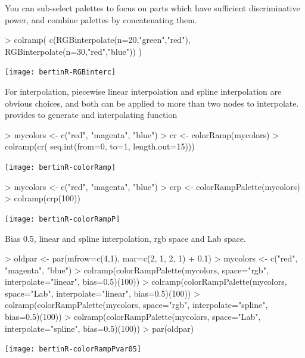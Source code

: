 \documentclass[nogin, dvips,12pt,a4paper,twoside]{amsart}
\begin{document}
\clearpage

You can sub-select palettes to focus on parts which have sufficient discriminative power, and combine palettes by concatenating them.
\begin{Schunk}
\begin{Sinput}
> 	colramp( c(RGBinterpolate(n=20,"green","red"), RGBinterpolate(n=30,"red","blue")) )
\end{Sinput}
\end{Schunk}
\texttt{[image: bertinR-RGBinterc]}


For interpolation, piecewise linear interpolation and spline interpolation are obvious choices, and both can be applied to more than two nodes to interpolate. \R{} provides  to generate and interpolating function

\begin{Schunk}
\begin{Sinput}
> mycolors <- c("red", "magenta", "blue")
> cr <- colorRamp(mycolors)
> colramp(cr( seq.int(from=0, to=1, length.out=15)))
\end{Sinput}
\end{Schunk}
\texttt{[image: bertinR-colorRamp]}



\begin{Schunk}
\begin{Sinput}
> mycolors <- c("red", "magenta", "blue")
> crp <- colorRampPalette(mycolors)
> colramp(crp(100))
\end{Sinput}
\end{Schunk}
\texttt{[image: bertinR-colorRampP]}


\clearpage

Bias 0.5, linear and spline interpolation, rgb space and Lab space.
\bigskip

\begin{Schunk}
\begin{Sinput}
> oldpar <- par(mfrow=c(4,1), mar=c(2, 1, 2, 1) + 0.1)
> mycolors <- c("red", "magenta", "blue")
> colramp(colorRampPalette(mycolors, space="rgb", interpolate="linear", bias=0.5)(100))
> colramp(colorRampPalette(mycolors, space="Lab", interpolate="linear", bias=0.5)(100))
> colramp(colorRampPalette(mycolors, space="rgb", interpolate="spline", bias=0.5)(100))
> colramp(colorRampPalette(mycolors, space="Lab", interpolate="spline", bias=0.5)(100))
> par(oldpar)
\end{Sinput}
\end{Schunk}
\texttt{[image: bertinR-colorRampPvar05]}
\end{document}
